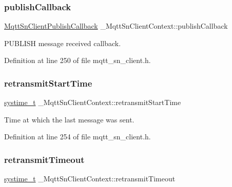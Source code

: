 \subsubsection{\texorpdfstring{publish\+Callback}{publishCallback}}
{\footnotesize\ttfamily \hyperlink{mqtt__sn__client_8h_a4f0890f5b533cda2ad972b1e433cf109}{Mqtt\+Sn\+Client\+Publish\+Callback} \+\_\+\+Mqtt\+Sn\+Client\+Context\+::publish\+Callback}



P\+U\+B\+L\+I\+SH message received callback. 



Definition at line 250 of file mqtt\+\_\+sn\+\_\+client.\+h.

\mbox{\label{struct__MqttSnClientContext_aa83c09d8530417289e0ff810ed7b4ed4}} 
\subsubsection{\texorpdfstring{retransmit\+Start\+Time}{retransmitStartTime}}
{\footnotesize\ttfamily \hyperlink{compiler__port_8h_ae3e32a98d431a02106616da3071832dd}{systime\+\_\+t} \+\_\+\+Mqtt\+Sn\+Client\+Context\+::retransmit\+Start\+Time}



Time at which the last message was sent. 



Definition at line 254 of file mqtt\+\_\+sn\+\_\+client.\+h.

\mbox{\label{struct__MqttSnClientContext_ae0413ca5fe25d8af672d6c9054c63ba5}} 
\subsubsection{\texorpdfstring{retransmit\+Timeout}{retransmitTimeout}}
{\footnotesize\ttfamily \hyperlink{compiler__port_8h_ae3e32a98d431a02106616da3071832dd}{systime\+\_\+t} \+\_\+\+Mqtt\+Sn\+Client\+Context\+::retransmit\+Timeout}



